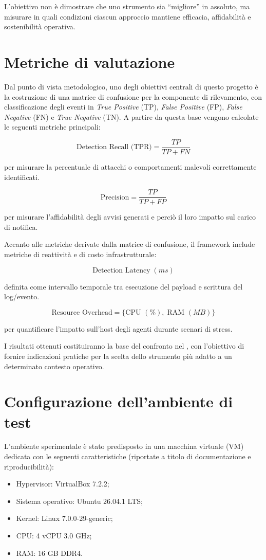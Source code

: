\documentclass[12pt,a4paper,openright,twoside]{book}
\begin{document}
L'obiettivo non è dimostrare che uno strumento sia ``migliore'' in assoluto, ma misurare in quali condizioni ciascun approccio mantiene efficacia, affidabilità e sostenibilità operativa.

\section{Metriche di valutazione}
\label{sec:metrics}

Dal punto di vista metodologico, uno degli obiettivi centrali di questo progetto è la costruzione di una matrice di confusione per la componente di rilevamento, con classificazione degli eventi in \textit{True Positive} (TP), \textit{False Positive} (FP), \textit{False Negative} (FN) e \textit{True Negative} (TN). A partire da questa base vengono calcolate le seguenti metriche principali:

\[
\text{Detection Recall (TPR)} = \frac{TP}{TP + FN}
\]

\noindent per misurare la percentuale di attacchi o comportamenti malevoli correttamente identificati.

\[
\text{Precision} = \frac{TP}{TP + FP}
\]

\noindent per misurare l'affidabilità degli avvisi generati e perciò il loro impatto sul carico di notifica.

\bigskip\noindent
Accanto alle metriche derivate dalla matrice di confusione, il framework include metriche di reattività e di costo infrastrutturale:

\[
\text{Detection Latency} \; (ms)
\]

\noindent definita come intervallo temporale tra esecuzione del payload e scrittura del log/evento.

\[
\text{Resource Overhead} = \{\text{CPU }(\%),\; \text{RAM }(MB)\}
\]

\noindent per quantificare l'impatto sull'host degli agenti durante scenari di stress.

\bigskip\noindent
I risultati ottenuti costituiranno la base del confronto nel , con l'obiettivo di fornire indicazioni pratiche per la scelta dello strumento più adatto a un determinato contesto operativo.

\section{Configurazione dell'ambiente di test}

L'ambiente sperimentale è stato predisposto in una macchina virtuale (VM) dedicata con le seguenti caratteristiche (riportate a titolo di documentazione e riproducibilità):
\begin{itemize}
    \item Hypervisor: VirtualBox 7.2.2;
    \item Sistema operativo: Ubuntu 26.04.1 LTS;
    \item Kernel: Linux 7.0.0-29-generic;
    \item CPU: 4 vCPU 3.0 GHz;
    \item RAM: 16 GB DDR4.
\end{itemize}
\end{document}
